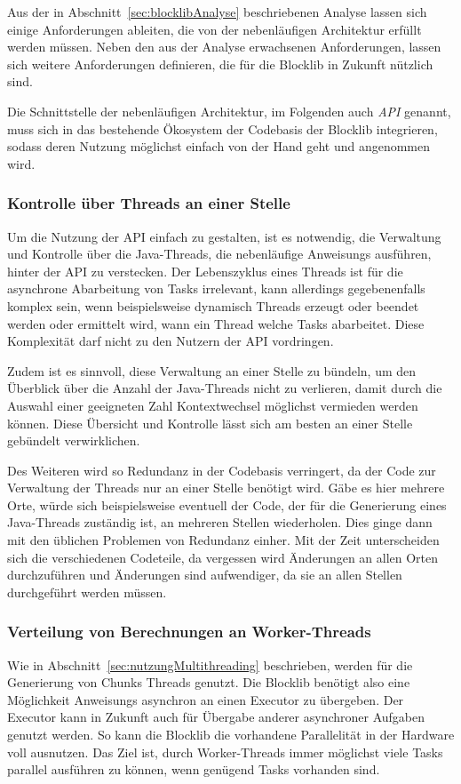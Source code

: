 Aus der in Abschnitt~\ref{sec:blocklibAnalyse} beschriebenen Analyse lassen sich einige Anforderungen ableiten, die von der nebenläufigen Architektur erfüllt werden müssen. Neben den aus der Analyse erwachsenen Anforderungen, lassen sich weitere Anforderungen definieren, die für die Blocklib in Zukunft nützlich sind.

Die Schnittstelle der nebenläufigen Architektur, im Folgenden auch \emph{API} genannt, muss sich in das bestehende Ökosystem der Codebasis der Blocklib integrieren, sodass deren Nutzung möglichst einfach von der Hand geht und angenommen wird.

\subsubsection{Kontrolle über Threads an einer Stelle}
Um die Nutzung der API einfach zu gestalten, ist es notwendig, die Verwaltung und Kontrolle über die Java-Threads, die nebenläufige \glspl{Anweisung} ausführen, hinter der API zu verstecken. Der Lebenszyklus eines Threads ist für die asynchrone Abarbeitung von Tasks irrelevant, kann allerdings gegebenenfalls komplex sein, wenn beispielsweise dynamisch Threads erzeugt oder beendet werden oder ermittelt wird, wann ein Thread welche Tasks abarbeitet. Diese Komplexität darf nicht zu den Nutzern der API vordringen.

Zudem ist es sinnvoll, diese Verwaltung an einer Stelle zu bündeln, um den Überblick über die Anzahl der Java-Threads nicht zu verlieren, damit durch die Auswahl einer geeigneten Zahl Kontextwechsel möglichst vermieden werden können. Diese Übersicht und Kontrolle lässt sich am besten an einer Stelle gebündelt verwirklichen.

Des Weiteren wird so Redundanz in der Codebasis verringert, da der Code zur Verwaltung der Threads nur an einer Stelle benötigt wird. Gäbe es hier mehrere Orte, würde sich beispielsweise eventuell der Code, der für die Generierung eines Java-Threads zuständig ist, an mehreren Stellen wiederholen. Dies ginge dann mit den üblichen Problemen von Redundanz einher. Mit der Zeit unterscheiden sich die verschiedenen Codeteile, da vergessen wird Änderungen an allen Orten durchzuführen und Änderungen sind aufwendiger, da sie an allen Stellen durchgeführt werden müssen.

\subsubsection{Verteilung von Berechnungen an Worker-Threads}
Wie in Abschnitt~\ref{sec:nutzungMultithreading} beschrieben, werden für die Generierung von Chunks Threads genutzt. Die Blocklib benötigt also eine Möglichkeit \glspl{Anweisung} asynchron an einen Executor zu übergeben. Der Executor kann in Zukunft auch für Übergabe anderer asynchroner Aufgaben genutzt werden. So kann die Blocklib die vorhandene Parallelität in der Hardware voll ausnutzen. Das Ziel ist, durch Worker-Threads immer möglichst viele Tasks parallel ausführen zu können, wenn genügend Tasks vorhanden sind.


